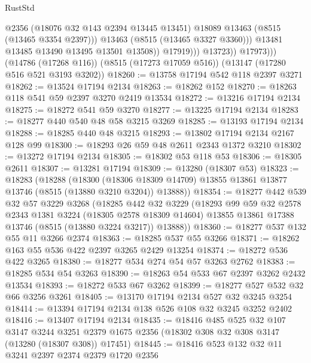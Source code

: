 \begin{lexlean}{RustStd}
\begin{coremodule}
                            @2356
                            (@18076 @32 @143 @2394 @13445 @13451)
                            @18089
                            @13463
                            (@8515 (@13465 @3354 @2397)))
                          @13463
                          (@8515 (@13465 @3327 @3360)))
                        @13481
                        @13485
                        @13490
                        @13495
                        @13501
                        @13508))
                    @17919)))
              @13723))
          @17973)))
    (@14786 (@17268 @116))
    (@8515 (@17273 @17059 @516))
    (@13147 (@17280 @516 @521 @3193 @3202))
@18260 := @13758 @17194 @542 @118 @2397 @3271
@18262 := @13524 @17194 @2134
@18263 := @18262 @152
@18270 := @18263 @118 @541 @59 @2397 @3270 @2419 @13534
@18272 := @13216 @17194 @2134
@18275 := @18272 @541 @59 @3270
@18277 := @13225 @17194 @2134
@18283 := @18277 @440 @540 @48 @58 @3215 @3269
@18285 := @13193 @17194 @2134
@18288 := @18285 @440 @48 @3215
@18293 := @13802 @17194 @2134 @2167 @128 @99
@18300 := @18293 @26 @59 @48 @2611 @2343 @1372 @3210
@18302 := @13272 @17194 @2134
@18305 := @18302 @53 @118 @53
@18306 := @18305 @2611
@18307 := @13281 @17194
@18309 := @13280 (@18307 @53)
@18323 := @18283
    (@18288
      (@18300
        (@18306 @18309 @14709)
        @13855
        @13861
        @13877
        @13746
        (@8515 (@13880 @3210 @3204))
        @13888))
@18354 := @18277
    @442
    @539
    @32
    @57
    @3229
    @3268
    (@18285
      @442
      @32
      @3229
      (@18293
        @99
        @59
        @32
        @2578
        @2343
        @1381
        @3224
        (@18305 @2578 @18309 @14604)
        @13855
        @13861
        @17388
        @13746
        (@8515 (@13880 @3224 @3217))
        @13888))
@18360 := @18277 @537 @132 @55 @11 @3266 @2374
@18363 := @18285 @537 @55 @3266
@18371 := @18262 @163 @55 @536 @422 @2397 @3265 @2429 @13254
@18374 := @18272 @536 @422 @3265
@18380 := @18277 @534 @274 @54 @57 @3263 @2762
@18383 := @18285 @534 @54 @3263
@18390 := @18263 @54 @533 @67 @2397 @3262 @2432 @13534
@18393 := @18272 @533 @67 @3262
@18399 := @18277 @527 @532 @32 @66 @3256 @3261
@18405 := @13170 @17194 @2134 @527 @32 @3245 @3254
@18414 := @13394 @17194 @2134 @138 @526 @108 @32 @3245 @3252 @2402
@18416 := @13407 @17194 @2134
@18435 := @18416
    @485
    @525
    @32
    @107
    @3147
    @3244
    @3251
    @2379
    @1675
    @2356
    (@18302 @308 @32 @308 @3147 (@13280 (@18307 @308)) @17451)
@18445 := @18416 @523 @132 @32 @11 @3241 @2397 @2374 @2379 @1720 @2356

\end{coremodule}
\end{lexlean}
